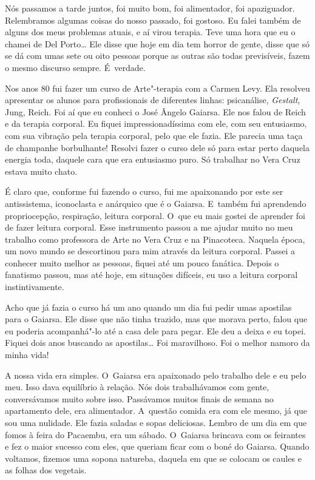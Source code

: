 Nós passamos a tarde juntos, foi muito bom, foi alimentador, foi
apaziguador. Relembramos algumas coisas do nosso passado, foi gostoso.
Eu falei também de alguns dos meus problemas atuais, e aí virou terapia.
Teve uma hora que eu o chamei de Del Porto… Ele disse que hoje em
dia tem horror de gente, disse que só se dá com umas sete ou oito
pessoas porque as outras são todas previsíveis, fazem o mesmo discurso
sempre. É~verdade.

Nos anos 80 fui fazer um curso de Arte"-terapia com a Carmen Levy. Ela
resolveu apresentar os alunos para profissionais de diferentes linhas:
psicanálise, \emph{Gestalt}, Jung, Reich. Foi aí que eu conheci o José
Ângelo Gaiarsa. Ele nos falou de Reich e da terapia corporal. Eu fiquei
impressionadíssima com ele, com seu entusiasmo, com sua vibração pela
terapia corporal, pelo que ele fazia. Ele parecia uma taça de champanhe
borbulhante! Resolvi fazer o curso dele só para estar perto daquela
energia toda, daquele cara que era entusiasmo puro. Só trabalhar no Vera
Cruz estava muito chato.

É claro que, conforme fui fazendo o curso, fui me apaixonando por este
ser antissistema, iconoclasta e anárquico que é o Gaiarsa. E~também fui
aprendendo propriocepção, respiração, leitura corporal. O~que eu mais
gostei de aprender foi de fazer leitura corporal. Esse instrumento
passou a me ajudar muito no meu trabalho como professora de Arte no Vera
Cruz e na Pinacoteca. Naquela época, um novo mundo se descortinou para
mim através da leitura corporal. Passei a conhecer muito melhor as
pessoas, fiquei até um pouco fanática. Depois o fanatismo passou, mas
até hoje, em situações difíceis, eu uso a leitura corporal
instintivamente.

Acho que já fazia o curso há um ano quando um dia fui pedir umas
apostilas para o Gaiarsa. Ele disse que não tinha trazido, mas que
morava perto, falou que eu poderia acompanhá"-lo até a casa dele para
pegar. Ele deu a deixa e eu topei. Fiquei dois anos buscando as
apostilas… Foi maravilhoso. Foi o melhor namoro da minha vida!

A nossa vida era simples. O~Gaiarsa era apaixonado pelo trabalho dele e
eu pelo meu. Isso dava equilíbrio à relação. Nós dois trabalhávamos com
gente, conversávamos muito sobre isso. Passávamos muitos finais de
semana no apartamento dele, era alimentador. A~questão comida era com
ele mesmo, já que sou uma nulidade. Ele fazia saladas e sopas
deliciosas. Lembro de um dia em que fomos à feira do Pacaembu, era um
sábado. O~Gaiarsa brincava com os feirantes e fez o maior sucesso com
eles, que queriam ficar com o boné do Gaiarsa. Quando voltamos, fizemos
uma sopona natureba, daquela em que se colocam os caules e as folhas dos
vegetais.

